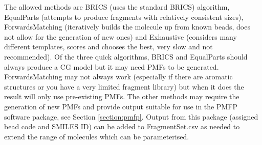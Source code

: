 \documentclass[10pt,a4paper,onecolumn]{report}
\begin{document}
The allowed methods are BRICS (uses the standard BRICS) algorithm, EqualParts (attempts to produce fragments with relatively consistent sizes), ForwardsMatching (iteratively builds the molecule up from known beads, does not allow for the generation of new ones) and Exhaustive (considers many different templates, scores and chooses the best, very slow and not recommended). Of the three quick algorithms, BRICS and EqualParts should always produce a CG model but it may need PMFs to be generated. ForwardsMatching may not always work (especially if there are aromatic structures or you have a very limited fragment library) but when it does the result will only use pre-existing PMFs. The other methods may require the generation of new PMFs and provide output suitable for use in the PMFP software package, see Section \ref{section:pmfp}. Output from this package (assigned bead code and SMILES ID) can be added to FragmentSet.csv as needed to extend the range of molecules which can be parameterised.
 
\end{document}
